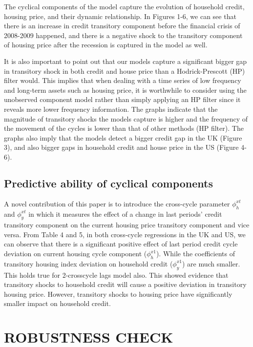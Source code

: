 \documentclass[
  12pt,
]{article}
\begin{document}
        The cyclical components of the model capture the evolution of household credit, housing price, and their dynamic relationship. In Figures 1-6, we can see that there is an increase in credit transitory component before the financial crisis of 2008-2009 happened, and there is a negative shock to the transitory component of housing price after the recession is captured in the model as well.
        
        It is also important to point out that our models capture a significant bigger gap in transitory shock in both credit and house price than a Hodrick-Prescott (HP) filter would. This implies that when dealing with a time series of low frequency and long-term assets such as housing price, it is worthwhile to consider using the unobserved component model rather than simply applying an HP filter since it reveals more lower frequency information. The graphs indicate that the magnitude of transitory shocks the models capture is higher and the frequency of the movement of the cycles is lower than that of other methods (HP filter). The graphs also imply that the models detect a bigger credit gap in the UK (Figure 3), and also bigger gaps in household credit and house price in the US (Figure 4-6).     
        
        
        \subsection{Predictive ability of cyclical components}
        A novel contribution of this paper is to introduce the cross-cycle parameter $\phi^{xt}_h$ and $\phi^{xt}_{y}$ in which it measures the effect of a change in last periods' credit transitory component on the current housing price transitory component and vice versa. From Table 4 and 5, in both cross-cycle regressions in the UK and US, we can observe that there is a significant positive effect of last period credit cycle deviation on current housing cycle component ($\phi^{x1}_{h}$). While the coefficients of transitory housing index deviation on household credit ($\phi^{x1}_{y}$) are much smaller. This holds true for 2-crosscycle lags model also. This showed evidence that transitory shocks to household credit will cause a positive deviation in transitory housing price. However, transitory shocks to housing price have significantly smaller impact on household credit.
        

\hypertarget{robustness-check}{%
\section{ROBUSTNESS CHECK}\label{robustness-check}}
\end{document}
